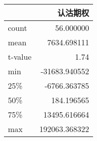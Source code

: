 \begin{tabular}{lr}
\toprule
{} &              认沽期权 \\
\midrule
count &      56.000000 \\
mean  &    7634.698111 \\
t-value   &   1.74\\
min   &  -31683.940552 \\
25\%   &   -6766.363785 \\
50\%   &     184.196565 \\
75\%   &   13495.616664 \\
max   &  192063.368322 \\
\bottomrule
\end{tabular}
